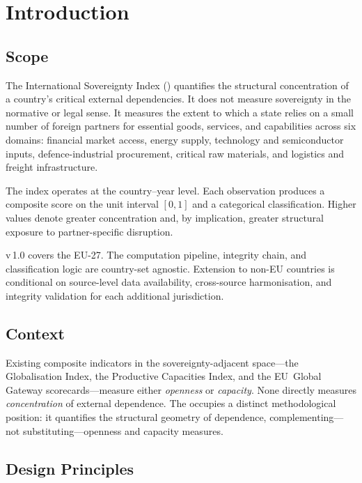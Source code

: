 \section{Introduction}\label{sec:introduction}

\subsection{Scope}\label{sec:intro:scope}

The International Sovereignty Index (\ISI) quantifies the structural
concentration of a country's critical external dependencies.  It does not
measure sovereignty in the normative or legal sense.  It measures the extent to
which a state relies on a small number of foreign partners for essential goods,
services, and capabilities across six domains: financial market access, energy
supply, technology and semiconductor inputs, defence-industrial procurement,
critical raw materials, and logistics and freight infrastructure.

The index operates at the country--year level.  Each observation produces a
composite score on the unit interval \([0,1]\) and a categorical
classification.  Higher values denote greater concentration and, by
implication, greater structural exposure to partner-specific disruption.

\ISI v\,1.0 covers the EU-27.  The computation pipeline, integrity chain,
and classification logic are country-set agnostic.  Extension to non-EU
countries is conditional on source-level data availability, cross-source
harmonisation, and integrity validation for each additional jurisdiction.

\subsection{Context}\label{sec:intro:context}

Existing composite indicators in the sovereignty-adjacent space---the
\citet{kof2023globalisation} Globalisation Index, the
\citet{unctad2023productive} Productive Capacities Index, and the
EU~Global Gateway scorecards---measure either \emph{openness} or
\emph{capacity}.  None directly measures \emph{concentration} of external
dependence.  The \ISI occupies a distinct methodological position: it
quantifies the structural geometry of dependence, complementing---not
substituting---openness and capacity measures.

\subsection{Design Principles}\label{sec:intro:principles}


